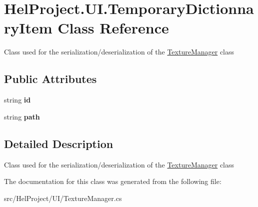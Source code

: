 \hypertarget{class_hel_project_1_1_u_i_1_1_temporary_dictionnary_item}{}\section{Hel\+Project.\+U\+I.\+Temporary\+Dictionnary\+Item Class Reference}
\label{class_hel_project_1_1_u_i_1_1_temporary_dictionnary_item}


Class used for the serialization/deserialization of the \hyperlink{class_hel_project_1_1_u_i_1_1_texture_manager}{Texture\+Manager} class  


\subsection*{Public Attributes}
\begin{DoxyCompactItemize}
\item 
\hypertarget{class_hel_project_1_1_u_i_1_1_temporary_dictionnary_item_a43f95cb22933c364f57dbf519248eb91}{}string {\bfseries id}\label{class_hel_project_1_1_u_i_1_1_temporary_dictionnary_item_a43f95cb22933c364f57dbf519248eb91}

\item 
\hypertarget{class_hel_project_1_1_u_i_1_1_temporary_dictionnary_item_a7ce5be50ae172de4a0dc1312766e6dfc}{}string {\bfseries path}\label{class_hel_project_1_1_u_i_1_1_temporary_dictionnary_item_a7ce5be50ae172de4a0dc1312766e6dfc}

\end{DoxyCompactItemize}


\subsection{Detailed Description}
Class used for the serialization/deserialization of the \hyperlink{class_hel_project_1_1_u_i_1_1_texture_manager}{Texture\+Manager} class 



The documentation for this class was generated from the following file\+:\begin{DoxyCompactItemize}
\item 
src/\+Hel\+Project/\+U\+I/Texture\+Manager.\+cs\end{DoxyCompactItemize}
